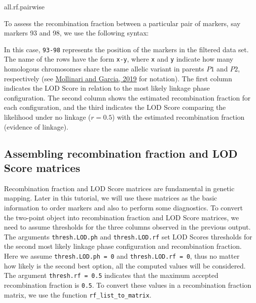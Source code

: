 \documentclass[
]{article}
\newenvironment{Shaded}{}{}
\newcommand{\DataTypeTok}[1]{\textcolor[rgb]{0.56,0.13,0.00}{#1}}
\newcommand{\DecValTok}[1]{\textcolor[rgb]{0.25,0.63,0.44}{#1}}
\newcommand{\KeywordTok}[1]{\textcolor[rgb]{0.00,0.44,0.13}{\textbf{#1}}}
\newcommand{\NormalTok}[1]{#1}
\newcommand{\OperatorTok}[1]{\textcolor[rgb]{0.40,0.40,0.40}{#1}}
\newcommand{\StringTok}[1]{\textcolor[rgb]{0.25,0.44,0.63}{#1}}
\begin{document}
\begin{Shaded}
\begin{Highlighting}[]
\NormalTok{all.rf.pairwise}
\end{Highlighting}
\end{Shaded}

To assess the recombination fraction between a particular pair of
markers, say markers 93 and 98, we use the following syntax:

\begin{Shaded}
\end{Shaded}

In this case, \texttt{93-98} represents the position of the markers in
the filtered data set. The name of the rows have the form \texttt{x-y},
where \texttt{x} and \texttt{y} indicate how many homologous chromosomes
share the same allelic variant in parents \(P1\) and \(P2\),
respectively (see \href{https://doi.org/10.1534/g3.119.400378}{Mollinari
and Garcia, 2019} for notation). The first column indicates the LOD
Score in relation to the most likely linkage phase configuration. The
second column shows the estimated recombination fraction for each
configuration, and the third indicates the LOD Score comparing the
likelihood under no linkage (\(r = 0.5\)) with the estimated
recombination fraction (evidence of linkage).

\hypertarget{assembling-recombination-fraction-and-lod-score-matrices}{%
\subsection{Assembling recombination fraction and LOD Score
matrices}\label{assembling-recombination-fraction-and-lod-score-matrices}}

Recombination fraction and LOD Score matrices are fundamental in genetic
mapping. Later in this tutorial, we will use these matrices as the basic
information to order markers and also to perform some diagnostics. To
convert the two-point object into recombination fraction and LOD Score
matrices, we need to assume thresholds for the three columns observed in
the previous output. The arguments \texttt{thresh.LOD.ph} and
\texttt{thresh.LOD.rf} set LOD Scores thresholds for the second most
likely linkage phase configuration and recombination fraction. Here we
assume \texttt{thresh.LOD.ph\ =\ 0} and \texttt{thresh.LOD.rf\ =\ 0},
thus no matter how likely is the second best option, all the computed
values will be considered. The argument \texttt{thresh.rf\ =\ 0.5}
indicates that the maximum accepted recombination fraction is
\texttt{0.5}. To convert these values in a recombination fraction
matrix, we use the function \texttt{rf\_list\_to\_matrix}.
\end{document}
